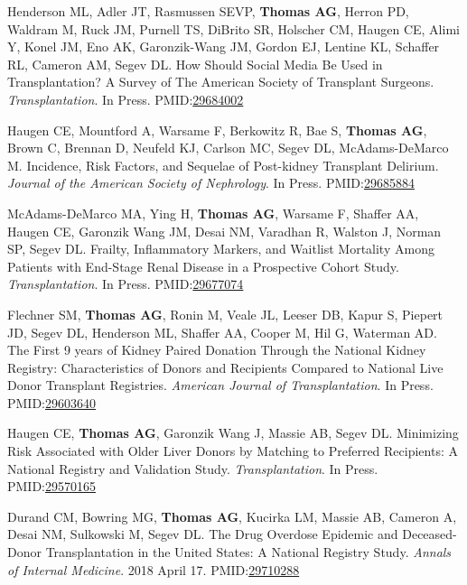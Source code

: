 \documentclass[10pt]{article}
\makeatletter
\newlength{\bibhang}
\newlength{\bibsep}
 {\@listi \global\bibsep\itemsep \global\advance\bibsep by\parsep}
\newenvironment{bibenum*}
  {\renewcommand\labelenumi{[\theenumi]}%
   \etaremune[
     topsep=0pt,
     itemsep=\bibsep,
     parsep=0pt,partopsep=0pt,
     itemindent=-\bibhang,
     leftmargin={\bibhang+\widthof{[999]}}]}
  {\endetaremune}
\newcommand{\pmid}[1]{PMID:\href{https://www.ncbi.nlm.nih.gov/pubmed/#1}{#1}}
\makeatother
\begin{document}
\begin{bibenum*}
\item Henderson ML, Adler JT, Rasmussen SEVP, \textbf{Thomas AG},
  Herron PD, Waldram M, Ruck JM, Purnell TS, DiBrito SR, Holscher CM,
  Haugen CE, Alimi Y, Konel JM, Eno AK, Garonzik-Wang JM, Gordon EJ,
  Lentine KL, Schaffer RL, Cameron AM, Segev DL.
  How Should Social Media Be Used in Transplantation?
  A Survey of The American Society of Transplant Surgeons.
  \emph{Transplantation}. In Press.
  \pmid{29684002} 

\item Haugen CE, Mountford A, Warsame F, Berkowitz R, Bae S,
  \textbf{Thomas AG}, Brown C, Brennan D, Neufeld KJ, Carlson MC,
  Segev DL, McAdams-DeMarco M.
  Incidence, Risk Factors, and Sequelae of Post-kidney Transplant Delirium.
  \emph{Journal of the American Society of Nephrology}. In Press.
  \pmid{29685884} 

\item McAdams-DeMarco MA, Ying H, \textbf{Thomas AG}, Warsame F,
  Shaffer AA, Haugen CE, Garonzik Wang JM, Desai NM, Varadhan R,
  Walston J, Norman SP, Segev DL. Frailty, Inflammatory Markers, and
  Waitlist Mortality Among Patients with End-Stage Renal Disease in a
  Prospective Cohort Study.
  \emph{Transplantation}. In Press.
  \pmid{29677074} 

\item Flechner SM, \textbf{Thomas AG}, Ronin M,
  Veale JL, Leeser DB, Kapur S, Piepert JD, Segev DL, Henderson ML,
  Shaffer AA, Cooper M, Hil G, Waterman AD.
  The First 9 years of Kidney Paired Donation Through the National Kidney
  Registry: Characteristics of Donors and Recipients Compared to National Live
  Donor Transplant Registries.
  \emph{American Journal of Transplantation}. In Press.
  \pmid{29603640} 

\item Haugen CE, \textbf{Thomas AG}, Garonzik Wang J, Massie AB,
  Segev DL. Minimizing Risk Associated with Older Liver Donors by
  Matching to Preferred Recipients: A National Registry and
  Validation Study.
  \emph{Transplantation}. In Press.
  \\\pmid{29570165} 

\item Durand CM\dag, Bowring MG\dag, \textbf{Thomas AG}, Kucirka LM,
  Massie AB, Cameron A, Desai NM, Sulkowski M, Segev DL.
  The Drug Overdose Epidemic and Deceased-Donor Transplantation
  in the United States: A National Registry Study.
  \emph{Annals of Internal Medicine}. 2018 April 17.
  \pmid{29710288} 


\end{bibenum*}
\end{document}
